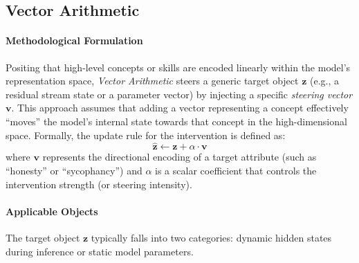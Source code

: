 \documentclass[11pt,letterpaper]{mystyle}
\begin{document}
\subsection{Vector Arithmetic}
\label{sec:vector_arithmetic}

\paragraph{Methodological Formulation}
Positing that high-level concepts or skills are encoded linearly within the model's representation space, \textit{Vector Arithmetic} steers a generic target object $\mathbf{z}$ (e.g., a residual stream state or a parameter vector) by injecting a specific \textit{steering vector} $\mathbf{v}$. This approach assumes that adding a vector representing a concept effectively ``moves'' the model's internal state towards that concept in the high-dimensional space.
Formally, the update rule for the intervention is defined as:
\begin{equation}
\hat{\mathbf{z}} \leftarrow \mathbf{z} + \alpha \cdot \mathbf{v}
\end{equation}
where $\mathbf{v}$ represents the directional encoding of a target attribute (such as ``honesty'' or ``sycophancy'') and $\alpha$ is a scalar coefficient that controls the intervention strength (or steering intensity).



\paragraph{Applicable Objects}
The target object $\mathbf{z}$ typically falls into two categories: dynamic hidden states during inference or static model parameters.
\end{document}

